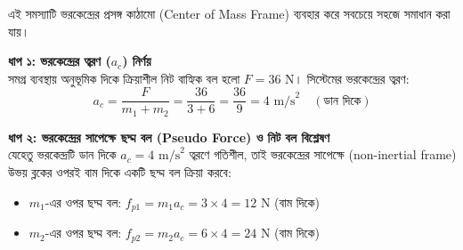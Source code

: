 \documentclass[12pt, a4paper]{article}
\begin{document}
\begin{tcolorbox}[solutionbox={সমাধান (Solution)}]
\noindent
এই সমস্যাটি ভরকেন্দ্রের প্রসঙ্গ কাঠামো (Center of Mass Frame) ব্যবহার করে সবচেয়ে সহজে সমাধান করা যায়।

\vspace{0.5em}
\noindent
\textbf{ধাপ ১: ভরকেন্দ্রের ত্বরণ ($a_c$) নির্ণয়} \\
সমগ্র ব্যবস্থায় অনুভূমিক দিকে ক্রিয়াশীল নিট বাহ্যিক বল হলো $F = 36\text{ N}$। 
সিস্টেমের ভরকেন্দ্রের ত্বরণ:
$$a_c = \frac{F}{m_1 + m_2} = \frac{36}{3 + 6} = \frac{36}{9} = 4\text{ m/s}^2 \quad (\text{ডান দিকে})$$

\vspace{0.5em}
\noindent
\textbf{ধাপ ২: ভরকেন্দ্রের সাপেক্ষে ছদ্ম বল (Pseudo Force) ও নিট বল বিশ্লেষণ} \\
যেহেতু ভরকেন্দ্রটি ডান দিকে $a_c = 4\text{ m/s}^2$ ত্বরণে গতিশীল, তাই ভরকেন্দ্রের সাপেক্ষে (non-inertial frame) উভয় ব্লকের ওপরই বাম দিকে একটি ছদ্ম বল ক্রিয়া করবে:
\begin{itemize}[leftmargin=*, parsep=0.3ex]
    \item $m_1$-এর ওপর ছদ্ম বল: $f_{p1} = m_1 a_c = 3 \times 4 = 12\text{ N}$ (বাম দিকে)
    \item $m_2$-এর ওপর ছদ্ম বল: $f_{p2} = m_2 a_c = 6 \times 4 = 24\text{ N}$ (বাম দিকে)
\end{itemize}

\vspace{1em}
\begin{center}
\end{center}
\end{tcolorbox}
\end{document}
